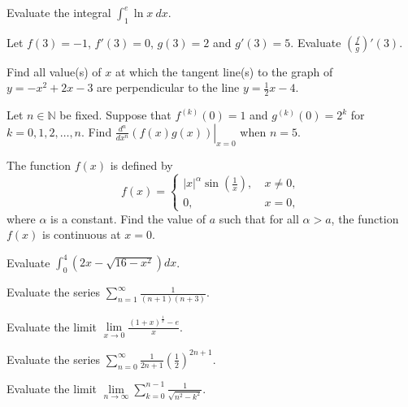 \begin{problem} Evaluate the integral $\displaystyle{\int_1^e\ln{x}\ dx}$.
\end{problem}

\begin{problem} Let $f(3)=-1$, $f'(3)=0$, $g(3)=2$ and $g'(3)=5$. Evaluate $\left(\frac{f}{g}\right)'(3)$.
\end{problem}

\begin{problem}  Find all value(s) of $x$ at which the tangent line(s) to the graph of $y=-x^2+2x-3$ are perpendicular to the line $y=\frac12 x-4$.
\end{problem}

\begin{problem} Let $n\in \mathbb{N}$ be fixed. Suppose that $f^{(k)}(0)=1$ and $g^{(k)}(0)=2^k$ for $k=0, 1, 2, \dots, n$. Find $\left.\frac{d^n}{dx^n}(f(x)g(x))\right |_{x=0}$ when $n=5$.  
\end{problem}

\begin{problem}\label{a}
The function $f(x)$ is defined by 
\[
f(x)=\begin{cases}
|x|^\alpha\sin(\frac{1}{x}), \ & x\neq 0,\\
0, \ & x=0,
\end{cases}
\]
where $\alpha$ is a constant. Find the value of $a$ such that for all $\alpha>a$,  the function $f(x)$ is continuous at $x=0$. 
\end{problem}

\begin{problem} Evaluate $\displaystyle{\int_0^4(2x-\sqrt{16-x^2})dx}$.
\end{problem}

\begin{problem} Evaluate the series $\sum\limits_{n=1}^\infty\frac{1}{(n+1)(n+3)}$.
\end{problem}

\begin{problem} Evaluate the limit $\lim\limits_{x\to 0}\frac{(1+x)^{\frac{1}{x}}-e}{x}$.
\end{problem}

\begin{problem} Evaluate the series $\sum\limits_{n=0}^\infty \frac{1}{2n+1}\left(\frac12\right)^{2n+1}$.
\end{problem}

\begin{problem} Evaluate the limit $\lim\limits_{n\to\infty}\sum\limits_{k=0}^{n-1}\frac{1}{\sqrt{n^2-k^2}}$.
\end{problem}

